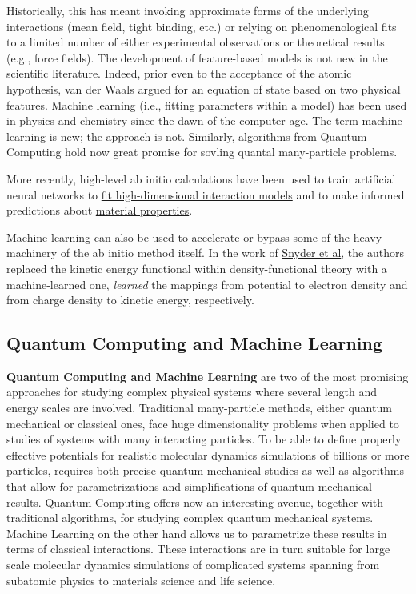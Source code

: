 \documentclass[%
oneside,                 %
final,                   %
10pt]{article}
\begin{document}
Historically, this has meant invoking
approximate forms of the underlying interactions (mean field, tight
binding, etc.) or relying on phenomenological fits to a limited number
of either experimental observations or theoretical results (e.g., force fields). 
The development of feature-based models is not
new in the scientific literature. Indeed, prior even to the acceptance
of the atomic hypothesis, van der Waals argued for an equation of
state based on two physical features. Machine learning (i.e.,
fitting parameters within a model) has been used in physics and
chemistry since the dawn of the computer age. The term machine
learning is new; the approach is not.  Similarly, algorithms from Quantum Computing hold now great promise for sovling quantal many-particle problems.

More recently, high-level ab initio calculations have been used to
train artificial neural networks to \href{{http://www.sciencedirect.com/science/article/pii/S0927025615007806?via%
models}  and to make informed predictions about \href{{https://www.nature.com/articles/srep40827}}{material properties}. 

Machine learning can also be used to accelerate or bypass some of the
heavy machinery of the ab initio method itself. In the work of \href{{https://journals.aps.org/prl/abstract/10.1103/PhysRevLett.108.253002}}{Snyder et al},  the authors
replaced the kinetic energy functional within density-functional
theory with a machine-learned one, 
\emph{learned} the mappings from potential to electron density and from
charge density to kinetic energy, respectively.


\subsection*{Quantum Computing and Machine Learning}



\textbf{Quantum Computing and Machine Learning} are two of the most promising
approaches for studying complex physical systems where several length
and energy scales are involved.  Traditional many-particle methods,
either quantum mechanical or classical ones, face huge dimensionality
problems when applied to studies of systems with many interacting
particles. To be able to define properly effective potentials for
realistic molecular dynamics simulations of billions or more particles,
requires both precise quantum mechanical studies as well as algorithms
that allow for parametrizations and simplifications of quantum
mechanical results. Quantum Computing offers now an interesting
avenue, together with traditional algorithms, for studying complex
quantum mechanical systems. Machine Learning on the other hand allows us to parametrize
these results in terms of classical interactions. These interactions
are in turn suitable for large scale molecular dynamics simulations of
complicated systems spanning from subatomic physics to materials
science and life science.
\end{document}
